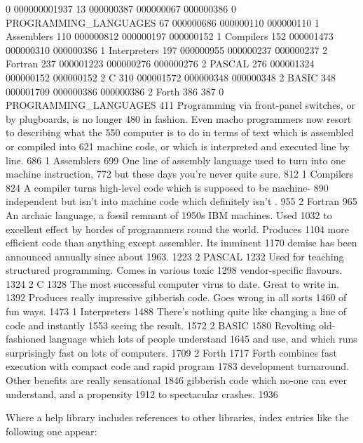 \documentclass[11pt,nolof]{starlink}
\begin{document}
\begin{small}
\begin{terminalv}
    0   000000001937
   13   000000387 000000067 000000386 0 PROGRAMMING_LANGUAGES
   67   000000686 000000110 000000110 1 Assemblers
  110   000000812 000000197 000000152 1 Compilers
  152   000001473 000000310 000000386 1 Interpreters
  197   000000955 000000237 000000237 2 Fortran
  237   000001223 000000276 000000276 2 PASCAL
  276   000001324 000000152 000000152 2 C
  310   000001572 000000348 000000348 2 BASIC
  348   000001709 000000386 000000386 2 Forth
  386
  387   0 PROGRAMMING_LANGUAGES
  411   Programming via front-panel switches, or by plugboards, is no longer
  480   in fashion.  Even macho programmers now resort to describing what the
  550   computer is to do in terms of text which is assembled or compiled into
  621   machine code, or which is interpreted and executed line by line.
  686   1 Assemblers
  699   One line of assembly language used to turn into one machine instruction,
  772   but these days you're never quite sure.
  812   1 Compilers
  824   A compiler turns high-level code which is supposed to be machine-
  890   independent but isn't into machine code which definitely isn't .
  955   2 Fortran
  965   An archaic language, a fossil remnant of 1950s IBM machines.  Used
 1032   to excellent effect by hordes of programmers round the world.  Produces
 1104   more efficient code than anything except assembler.  Its imminent
 1170   demise has been announced annually since about 1963.
 1223   2 PASCAL
 1232   Used for teaching structured programming.  Comes in various toxic
 1298   vendor-specific flavours.
 1324   2 C
 1328   The most successful computer virus to date.  Great to write in.
 1392   Produces really impressive gibberish code.  Goes wrong in all sorts
 1460   of fun ways.
 1473   1 Interpreters
 1488   There's nothing quite like changing a line of code and instantly
 1553   seeing the result.
 1572   2 BASIC
 1580   Revolting old-fashioned language which lots of people understand
 1645   and use, and which runs surprisingly fast on lots of computers.
 1709   2 Forth
 1717   Forth combines fast execution with compact code and rapid program
 1783   development turnaround.  Other benefits are really sensational
 1846   gibberish code which no-one can ever understand, and a propensity
 1912   to spectacular crashes.
 1936
\end{terminalv}
\end{small}

Where a help library includes references to other libraries, index
entries like the following one appear:
\end{document}

